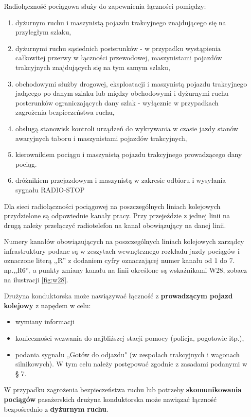 
Radiołączność pociągowa służy do zapewnienia łączności pomiędzy:
\begin{enumerate}
\item dyżurnym ruchu i maszynistą pojazdu trakcyjnego znajdującego się na przyległym szlaku,
\item dyżurnymi ruchu sąsiednich posterunków - w przypadku wystąpienia całkowitej przerwy w łączności przewodowej, maszynistami pojazdów trakcyjnych znajdujących się na tym samym szlaku,
\item obchodowymi służby drogowej, eksploatacji i maszynistą pojazdu trakcyjnego jadącego po danym szlaku lub między obchodowymi i dyżurnymi
ruchu posterunków ograniczających dany szlak - wyłącznie w przypadkach zagrożenia bezpieczeństwa ruchu,
\item obsługą stanowisk kontroli urządzeń do wykrywania w czasie jazdy stanów awaryjnych taboru i maszynistami pojazdów trakcyjnych,
\item kierownikiem pociągu i maszynistą pojazdu trakcyjnego prowadzącego dany pociąg.
\item dróżnikiem przejazdowym i maszynistą w zakresie odbioru i wysyłania sygnału RADIO-STOP
\end{enumerate}

Dla sieci radiołączności pociągowej na poszczególnych liniach kolejowych przydzielone są odpowiednie kanały pracy. Przy przejeździe z jednej linii na drugą należy przełączyć radiotelefon na kanał obowiązujący na danej linii.

Numery kanałów obowiązujących na poszczególnych liniach kolejowych zarządcy infrastruktury podane są w zeszytach wewnętrznego rozkładu jazdy
pociągów i oznaczone literą ,,R'' z dodaniem cyfry oznaczającej numer kanału od 1 do 7. np.,,R6'', a punkty zmiany kanału na linii określone są wskaźnikami W28, zobacz na ilustracji \ref{fig:w28}.

Drużyna konduktorska może nawiązywać łączność z \textbf{prowadzącym pojazd kolejowy} z napędem w celu:
\begin{itemize}
	\item wymiany informacji
	\item konieczności wezwania do najbliższej stacji pomocy (policja, pogotowie itp.),
	\item podania sygnału „Gotów do odjazdu" (w zespołach trakcyjnych i wagonach silnikowych). W tym celu należy postępować zgodnie
	z zasadami podanymi w § 7.
\end{itemize}
W przypadku zagrożenia bezpieczeństwa ruchu lub potrzeby \textbf{skomunikowania pociągów} pasażerskich drużyna konduktorska może nawiązać łączność bezpośrednio z \textbf{dyżurnym ruchu}. 

